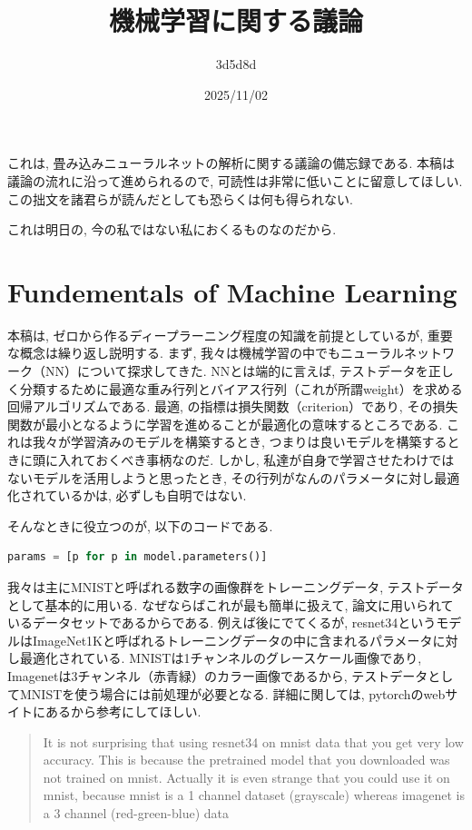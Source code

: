 \documentclass{ltjsarticle}      %
\title{機械学習に関する議論}
\author{3d5d8d}
\date{2025/11/02}
\begin{document}
\maketitle

これは, 畳み込みニューラルネットの解析に関する議論の備忘録である.
本稿は議論の流れに沿って進められるので, 可読性は非常に低いことに留意してほしい.
この拙文を諸君らが読んだとしても恐らくは何も得られない.\par
これは明日の, 今の私ではない私におくるものなのだから.

\section{Fundementals of Machine Learning}
本稿は, ゼロから作るディープラーニング程度の知識を前提としているが, 重要な概念は繰り返し説明する.
まず, 我々は機械学習の中でもニューラルネットワーク（NN）について探求してきた.
NNとは端的に言えば, テストデータを正しく分類するために最適な重み行列とバイアス行列（これが所謂weight）を求める回帰アルゴリズムである.
最適, の指標は損失関数（criterion）であり, その損失関数が最小となるように学習を進めることが最適化の意味するところである.
これは我々が学習済みのモデルを構築するとき, つまりは良いモデルを構築するときに頭に入れておくべき事柄なのだ.
しかし, 私達が自身で学習させたわけではないモデルを活用しようと思ったとき, その行列がなんのパラメータに対し最適化されているかは, 必ずしも自明ではない.\par
そんなときに役立つのが, 以下のコードである.

\begin{lstlisting}[caption=hoge, language=python]
    params = [p for p in model.parameters()]
\end{lstlisting}


我々は主にMNISTと呼ばれる数字の画像群をトレーニングデータ, テストデータとして基本的に用いる.
なぜならばこれが最も簡単に扱えて, 論文に用いられているデータセットであるからである.
例えば後にでてくるが, resnet34というモデルはImageNet1Kと呼ばれるトレーニングデータの中に含まれるパラメータに対し最適化されている.
MNISTは1チャンネルのグレースケール画像であり, Imagenetは3チャンネル（赤青緑）のカラー画像であるから, テストデータとしてMNISTを使う場合には前処理が必要となる.
詳細に関しては, pytorchのwebサイトにあるから参考にしてほしい.

\begin{quote}
It is not surprising that using resnet34 on mnist data that you get very low accuracy.
This is because the pretrained model that you downloaded was not trained on mnist.
Actually it is even strange that you could use it on mnist, because mnist is a 1 channel dataset (grayscale) whereas imagenet is a 3 channel (red-green-blue) data
\end{quote}
\end{document}
